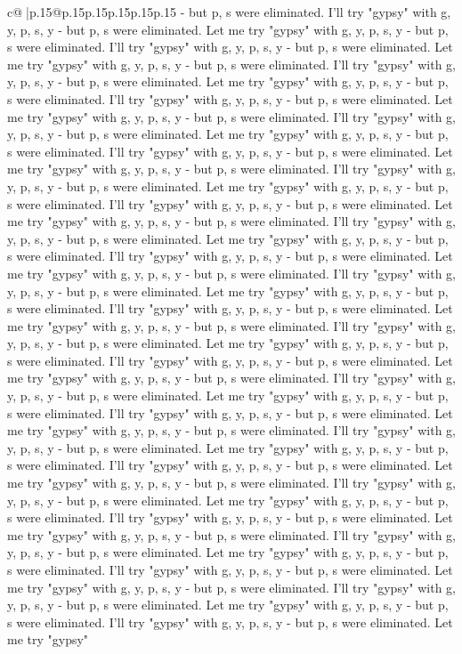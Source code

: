 \documentclass{article}
\begin{document}
{\begin{supertabular}{c@{$\;$}|p{.15\linewidth}@{}p{.15\linewidth}p{.15\linewidth}p{.15\linewidth}p{.15\linewidth}p{.15\linewidth}}
{{{{-} but p, s were eliminated. I'll try "gypsy" with g, y, p, s, y {-} but p, s were eliminated. Let me try "gypsy" with g, y, p, s, y {-} but p, s were eliminated. I'll try "gypsy" with g, y, p, s, y {-} but p, s were eliminated. Let me try "gypsy" with g, y, p, s, y {-} but p, s were eliminated. I'll try "gypsy" with g, y, p, s, y {-} but p, s were eliminated. Let me try "gypsy" with g, y, p, s, y {-} but p, s were eliminated. I'll try "gypsy" with g, y, p, s, y {-} but p, s were eliminated. Let me try "gypsy" with g, y, p, s, y {-} but p, s were eliminated. I'll try "gypsy" with g, y, p, s, y {-} but p, s were eliminated. Let me try "gypsy" with g, y, p, s, y {-} but p, s were eliminated. I'll try "gypsy" with g, y, p, s, y {-} but p, s were eliminated. Let me try "gypsy" with g, y, p, s, y {-} but p, s were eliminated. I'll try "gypsy" with g, y, p, s, y {-} but p, s were eliminated. Let me try "gypsy" with g, y, p, s, y {-} but p, s were eliminated. I'll try "gypsy" with g, y, p, s, y {-} but p, s were eliminated. Let me try "gypsy" with g, y, p, s, y {-} but p, s were eliminated. I'll try "gypsy" with g, y, p, s, y {-} but p, s were eliminated. Let me try "gypsy" with g, y, p, s, y {-} but p, s were eliminated. I'll try "gypsy" with g, y, p, s, y {-} but p, s were eliminated. Let me try "gypsy" with g, y, p, s, y {-} but p, s were eliminated. I'll try "gypsy" with g, y, p, s, y {-} but p, s were eliminated. Let me try "gypsy" with g, y, p, s, y {-} but p, s were eliminated. I'll try "gypsy" with g, y, p, s, y {-} but p, s were eliminated. Let me try "gypsy" with g, y, p, s, y {-} but p, s were eliminated. I'll try "gypsy" with g, y, p, s, y {-} but p, s were eliminated. Let me try "gypsy" with g, y, p, s, y {-} but p, s were eliminated. I'll try "gypsy" with g, y, p, s, y {-} but p, s were eliminated. Let me try "gypsy" with g, y, p, s, y {-} but p, s were eliminated. I'll try "gypsy" with g, y, p, s, y {-} but p, s were eliminated. Let me try "gypsy" with g, y, p, s, y {-} but p, s were eliminated. I'll try "gypsy" with g, y, p, s, y {-} but p, s were eliminated. Let me try "gypsy" with g, y, p, s, y {-} but p, s were eliminated. I'll try "gypsy" with g, y, p, s, y {-} but p, s were eliminated. Let me try "gypsy" with g, y, p, s, y {-} but p, s were eliminated. I'll try "gypsy" with g, y, p, s, y {-} but p, s were eliminated. Let me try "gypsy" with g, y, p, s, y {-} but p, s were eliminated. I'll try "gypsy" with g, y, p, s, y {-} but p, s were eliminated. Let me try "gypsy" with g, y, p, s, y {-} but p, s were eliminated. I'll try "gypsy" with g, y, p, s, y {-} but p, s were eliminated. Let me try "gypsy" with g, y, p, s, y {-} but p, s were eliminated. I'll try "gypsy" with g, y, p, s, y {-} but p, s were eliminated. Let me try "gypsy" with g, y, p, s, y {-} but p, s were eliminated. I'll try "gypsy" with g, y, p, s, y {-} but p, s were eliminated. Let me try "gypsy" with g, y, p, s, y {-} but p, s were eliminated. I'll try "gypsy" with g, y, p, s, y {-} but p, s were eliminated. Let me try "gypsy" with g, y, p, s, y {-} but p, s were eliminated. I'll try "gypsy" with g, y, p, s, y {-} but p, s were eliminated. Let me try "gypsy" }}}
\end{supertabular}}
\end{document}
